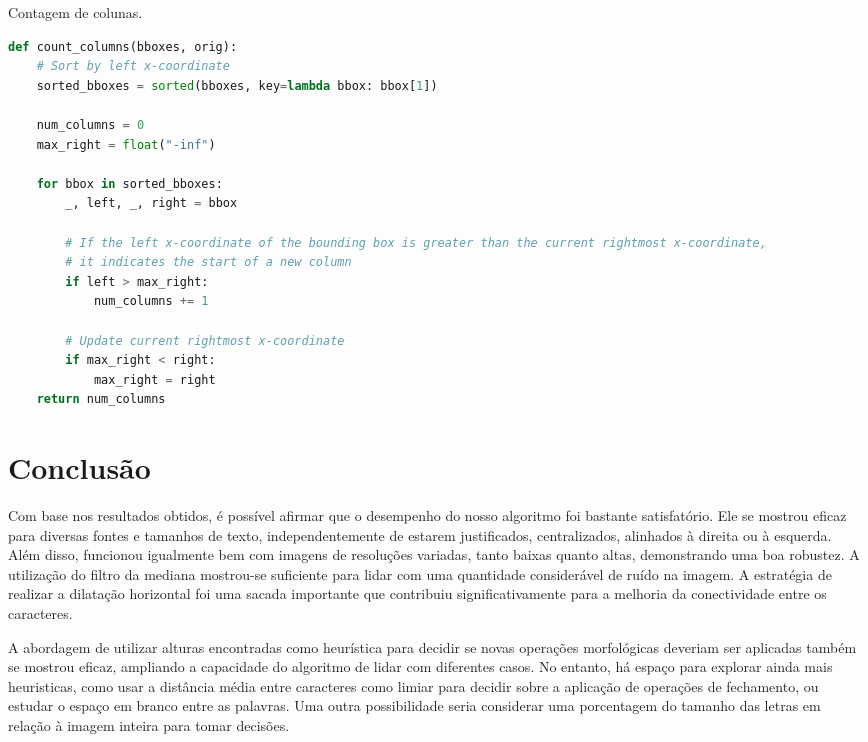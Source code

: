 \documentclass[english, 
               brazil, 
               bsc] %
               {dcomp-abntex2}
\begin{document}
\begin{codigo}[h]
  \caption{\small Contagem de colunas.}
 \label{cod-columncount}
\begin{lstlisting}[language=python]
def count_columns(bboxes, orig):
    # Sort by left x-coordinate
    sorted_bboxes = sorted(bboxes, key=lambda bbox: bbox[1])

    num_columns = 0
    max_right = float("-inf")

    for bbox in sorted_bboxes:
        _, left, _, right = bbox

        # If the left x-coordinate of the bounding box is greater than the current rightmost x-coordinate,
        # it indicates the start of a new column
        if left > max_right:
            num_columns += 1

        # Update current rightmost x-coordinate
        if max_right < right:
            max_right = right
    return num_columns
\end{lstlisting}
\end{codigo}




\chapter{Conclusão} \label{ch-conclusao}

Com base nos resultados obtidos, é possível afirmar que o desempenho do nosso algoritmo foi bastante satisfatório. Ele se mostrou eficaz para diversas fontes e tamanhos de texto, independentemente de estarem justificados, centralizados, alinhados à direita ou à esquerda. Além disso, funcionou igualmente bem com imagens de resoluções variadas, tanto baixas quanto altas, demonstrando uma boa robustez. A utilização do filtro da mediana mostrou-se suficiente para lidar com uma quantidade considerável de ruído na imagem. A estratégia de realizar a dilatação horizontal foi uma sacada importante que contribuiu significativamente para a melhoria da conectividade entre os caracteres.

A abordagem de utilizar alturas encontradas como heurística para decidir se novas operações morfológicas deveriam ser aplicadas também se mostrou eficaz, ampliando a capacidade do algoritmo de lidar com diferentes casos. No entanto, há espaço para explorar ainda mais heuristicas, como usar a distância média entre caracteres como limiar para decidir sobre a aplicação de operações de fechamento, ou estudar o espaço em branco entre as palavras. Uma outra possibilidade seria considerar uma porcentagem do tamanho das letras em relação à imagem inteira para tomar decisões.
\end{document}
